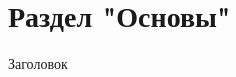\documentclass[a4paper, 12pt]{article}
\begin{document}
    \section{Раздел "Основы"}
    Заголовок
\end{document}
